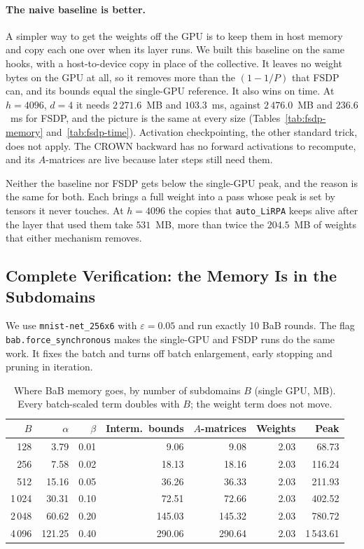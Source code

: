 \documentclass[runningheads]{llncs}
\begin{document}
\paragraph{The naive baseline is better.} A simpler way to get the weights off
the GPU is to keep them in host memory and copy each one over when its layer
runs. We built this baseline on the same hooks, with a host-to-device copy in
place of the collective. It leaves no weight bytes on the GPU at all, so it
removes more than the $(1-1/P)$ that FSDP can, and its bounds equal the
single-GPU reference. It also wins on time. At $h{=}4096$, $d{=}4$ it needs
$2\,271.6$~MB and $103.3$~ms, against $2\,476.0$~MB and $236.6$~ms for FSDP,
and the picture is the same at every size (Tables~\ref{tab:fsdp-memory}
and~\ref{tab:fsdp-time}). Activation checkpointing, the other standard trick,
does not apply. The CROWN backward has no forward activations to recompute, and
its $A$-matrices are live because later steps still need them.

Neither the baseline nor FSDP gets below the single-GPU peak, and the reason is
the same for both. Each brings a full weight into a pass whose peak is set by
tensors it never touches. At $h{=}4096$ the copies that \texttt{auto\_LiRPA}
keeps alive after the layer that used them take $531$~MB, more than twice the
$204.5$~MB of weights that either mechanism removes.

\subsection{Complete Verification: the Memory Is in the Subdomains}
\label{sec:exp-bab}

We use \texttt{mnist-net\_256x6} \cite{arXiv2212VNNCOMP2022} with
$\varepsilon{=}0.05$ and run exactly 10 BaB rounds. The flag
\texttt{bab.force\_synchronous} makes the single-GPU and FSDP runs do the same
work. It fixes the batch and turns off batch enlargement, early stopping and
pruning in iteration.

\begin{table}[t]
\caption{Where BaB memory goes, by number of subdomains $B$ (single GPU, MB). Every batch-scaled term doubles with $B$; the weight term does not move.}
\label{tab:bab-breakdown}
\small
\centering
\begin{tabular}{rrrrrrr}
\toprule
$B$ & $\alpha$ & $\beta$ & Interm.\ bounds & $A$-matrices & Weights & Peak \\
\midrule
  128 &   3.79 & 0.01 &  9.06 &  9.08 & 2.03 &    68.73 \\
  256 &   7.58 & 0.02 & 18.13 & 18.16 & 2.03 &   116.24 \\
  512 &  15.16 & 0.05 & 36.26 & 36.33 & 2.03 &   211.93 \\
1\,024 &  30.31 & 0.10 & 72.51 & 72.66 & 2.03 &   402.52 \\
2\,048 &  60.62 & 0.20 &145.03 &145.32 & 2.03 &   780.72 \\
4\,096 & 121.25 & 0.40 &290.06 &290.64 & 2.03 & 1\,543.61 \\
\bottomrule
\end{tabular}
\end{table}
\end{document}
